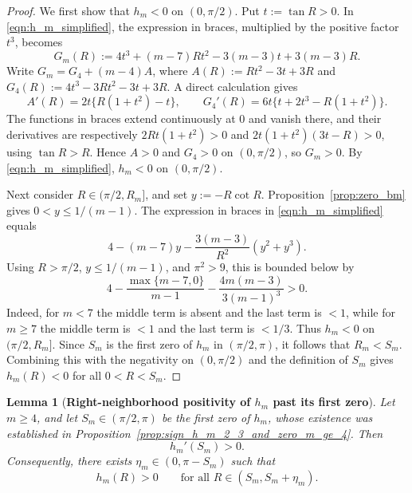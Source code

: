 \documentclass{amsart}
\newtheorem{lemma}[theorem]{Lemma}
\theoremstyle{definition}
\theoremstyle{remark}
\newcommand\0{\boldsymbol{0}}
\begin{document}
\begin{proof}
We first show that \(h_m<0\) on \((0,\pi/2)\). Put \(t:=\tan R>0\). In
\eqref{eqn:h_m_simplified}, the expression in braces, multiplied by the positive factor \(t^3\), becomes
\[
    G_m(R):=4t^3+(m-7)Rt^2-3(m-3)t+3(m-3)R.
\]
Write \(G_m=G_4+(m-4)A\), where
\(A(R):=Rt^2-3t+3R\) and \(G_4(R):=4t^3-3Rt^2-3t+3R\). A direct calculation gives
\[
    A'(R)=2t\{R(1+t^2)-t\},\qquad
    G_4'(R)=6t\{t+2t^3-R(1+t^2)\}.
\]
The functions in braces extend continuously at \(0\) and vanish there, and their derivatives are respectively
\(2Rt(1+t^2)>0\) and \(2t(1+t^2)(3t-R)>0\), using \(\tan R>R\). Hence \(A>0\) and
\(G_4>0\) on \((0,\pi/2)\), so \(G_m>0\). By \eqref{eqn:h_m_simplified}, \(h_m<0\) on
\((0,\pi/2)\).

Next consider \(R\in(\pi/2,R_m]\), and set \(y:=-R\cot R\). Proposition~\ref{prop:zero_bm}
gives \(0<y\le1/(m-1)\). The expression in braces in \eqref{eqn:h_m_simplified} equals
\[
    4-(m-7)y-\frac{3(m-3)}{R^2}(y^2+y^3).
\]
Using \(R>\pi/2\), \(y\le1/(m-1)\), and \(\pi^2>9\), this is bounded below by
\[
    4-\frac{\max\{m-7,0\}}{m-1}
      -\frac{4m(m-3)}{3(m-1)^3}>0.
\]
Indeed, for \(m<7\) the middle term is absent and the last term is \(<1\), while for \(m\ge7\) the
middle term is \(<1\) and the last term is \(<1/3\). Thus \(h_m<0\) on \((\pi/2,R_m]\). Since
\(S_m\) is the first zero of \(h_m\) in \((\pi/2,\pi)\), it follows that \(R_m<S_m\). Combining this
with the negativity on \((0,\pi/2)\) and the definition of \(S_m\) gives \(h_m(R)<0\) for all
\(0<R<S_m\).
\end{proof}

\begin{lemma}[\textbf{Right-neighborhood positivity of \(h_m\) past its first zero}]
\label{lem:positivity-h_m-past-first-zero}
Let \(m\ge4\), and let \(S_m\in(\pi/2,\pi)\) be the first zero of \(h_m\), whose existence was
established in Proposition~\ref{prop:sign_h_m_2_3_and_zero_m_ge_4}. Then
\[
    \boxed{h_m'(S_m)>0.}
\]
Consequently, there exists \(\eta_m \in(0,\pi-S_m)\) such that
\[
    h_m(R)>0\qquad\text{for all }R\in(S_m,S_m+\eta_m).
\]
\end{lemma}
\end{document}
